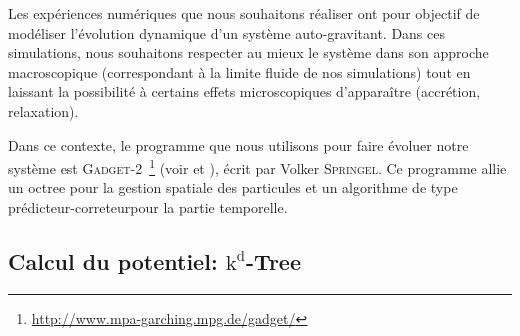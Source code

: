 		Les expériences numériques que nous souhaitons réaliser ont pour objectif de modéliser l'évolution
		dynamique d'un système auto-gravitant. Dans ces simulations, nous souhaitons respecter au mieux le
		système dans son approche macroscopique (correspondant à la limite fluide de nos simulations) tout en
		laissant la possibilité à certains effets microscopiques d'apparaître (accrétion, relaxation).


		Dans ce contexte, le programme que nous utilisons pour faire évoluer notre système est
		\textsc{Gadget-2}~\footnote{\url{http://www.mpa-garching.mpg.de/gadget/}} (voir \cite{gadget2} et \cite{gadget1}),
		écrit par Volker \textsc{Springel}.
		Ce programme allie un octree pour la gestion spatiale des particules et un algorithme de type \og
		prédicteur-correteur\fg pour la partie temporelle.



		\subsection{Calcul du potentiel: $\mathrm{k}^\mathrm{d}$-Tree}
			\label{Sec::KdTree}


